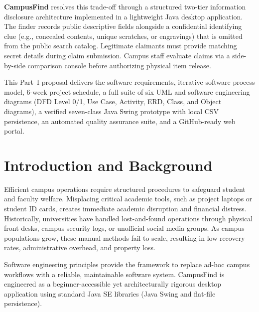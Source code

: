 \documentclass[11pt,a4paper]{article}
\begin{document}
\textbf{CampusFind} resolves this trade-off through a structured two-tier information disclosure architecture implemented in a lightweight Java desktop application. The finder records public descriptive fields alongside a confidential identifying clue (e.g., concealed contents, unique scratches, or engravings) that is omitted from the public search catalog. Legitimate claimants must provide matching secret details during claim submission. Campus staff evaluate claims via a side-by-side comparison console before authorizing physical item release. 

This Part~I proposal delivers the software requirements, iterative software process model, 6-week project schedule, a full suite of six UML and software engineering diagrams (DFD Level 0/1, Use Case, Activity, ERD, Class, and Object diagrams), a verified seven-class Java Swing prototype with local CSV persistence, an automated quality assurance suite, and a GitHub-ready web portal.

\section{Introduction and Background}
Efficient campus operations require structured procedures to safeguard student and faculty welfare. Misplacing critical academic tools, such as project laptops or student ID cards, creates immediate academic disruption and financial distress. Historically, universities have handled lost-and-found operations through physical front desks, campus security logs, or unofficial social media groups. As campus populations grow, these manual methods fail to scale, resulting in low recovery rates, administrative overhead, and property loss.

Software engineering principles provide the framework to replace ad-hoc campus workflows with a reliable, maintainable software system. CampusFind is engineered as a beginner-accessible yet architecturally rigorous desktop application using standard Java SE libraries (Java Swing and flat-file persistence).

\end{document}

